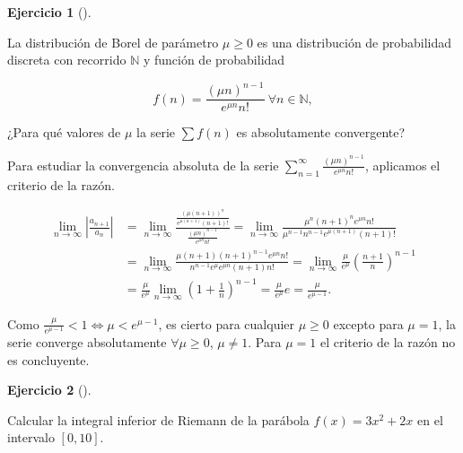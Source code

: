 \documentclass[
  spanish,
  a4paper,
]{scrreport}
\theoremstyle{definition}
\newtheorem{exercise}{Ejercicio}[chapter]
\theoremstyle{remark}
\begin{document}
\begin{exercise}[]\protect\hypertarget{exr-3}{}\label{exr-3}

La distribución de Borel de parámetro \(\mu\geq 0\) es una distribución
de probabilidad discreta con recorrido \(\mathbb{N}\) y función de
probabilidad

\[
f(n) = \frac{(\mu n)^{n-1}}{e^{\mu n}n!}\ \forall n\in\mathbb{N}, 
\]

¿Para qué valores de \(\mu\) la serie \(\sum f(n)\) es absolutamente
convergente?

\end{exercise}

\begin{tcolorbox}[enhanced jigsaw, arc=.35mm, bottomrule=.15mm, bottomtitle=1mm, breakable, colback=white, colbacktitle=quarto-callout-tip-color!10!white, colframe=quarto-callout-tip-color-frame, coltitle=black, left=2mm, leftrule=.75mm, opacityback=0, opacitybacktitle=0.6, rightrule=.15mm, title=\textcolor{quarto-callout-tip-color}{\faLightbulb}\hspace{0.5em}{Solución}, titlerule=0mm, toprule=.15mm, toptitle=1mm]

Para estudiar la convergencia absoluta de la serie
\(\sum_{n=1}^\infty \frac{(\mu n)^{n-1}}{e^{\mu n}n!}\), aplicamos el
criterio de la razón.

\begin{align*}
\lim_{n\to\infty} \left|\frac{a_{n+1}}{a_n}\right| 
&= \lim_{n\to\infty} \frac{\frac{(\mu(n+1))^n}{e^{\mu(n+1)}(n+1)!}}{\frac{(\mu n)^{n-1}}{e^{\mu n}n!}}
= \lim_{n\to\infty} \frac{\mu^n (n+1)^n e^{\mu n}n!}{\mu^{n-1}n^{n-1}e^{\mu(n+1)}(n+1)!} \\
&= \lim_{n\to\infty} \frac{\mu (n+1)(n+1)^{n-1} e^{\mu n}n!}{n^{n-1}e^{\mu}e^{\mu n}(n+1)n!} 
= \lim_{n\to\infty} \frac{\mu}{e^\mu}\left(\frac{n+1}{n}\right)^{n-1}\\
&= \frac{\mu}{e^\mu}\lim_{n\to\infty} \left(1+\frac{1}{n}\right)^{n-1} 
= \frac{\mu}{e^\mu} e 
= \frac{\mu}{e^{\mu-1}}. 
\end{align*}

Como \(\frac{\mu}{e^{\mu-1}} < 1 \Leftrightarrow \mu < e^{\mu-1}\), es
cierto para cualquier \(\mu\geq 0\) excepto para \(\mu=1\), la serie
converge absolutamente \(\forall \mu\geq 0\), \(\mu\neq 1\). Para
\(\mu=1\) el criterio de la razón no es concluyente.

\end{tcolorbox}

\begin{exercise}[]\protect\hypertarget{exr-4}{}\label{exr-4}

Calcular la integral inferior de Riemann de la parábola \(f(x)=3x^2+2x\)
en el intervalo \([0,10]\).

\end{exercise}
\end{document}
